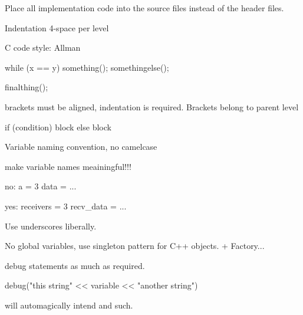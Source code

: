 \documentclass{article}
\begin{document}
Place all implementation code into the source files instead of the header files.

Indentation 4-space per level

C code style: Allman

while (x == y)
{
    something();
    somethingelse();
}

finalthing();

brackets must be aligned, indentation is required. Brackets belong to parent level

if (condition)
{
	block
}
else
{
	block
}

Variable naming convention, no camelcase

make variable names meainingful!!!

no: 
a = 3
data = ...

yes:
receivers = 3
recv\_data = ...

Use underscores liberally.

No global variables, use singleton pattern for C++ objects. + Factory...

debug statements as much as required.

debug("this string" << variable << "another string")

will automagically intend and such.
\end{document}

